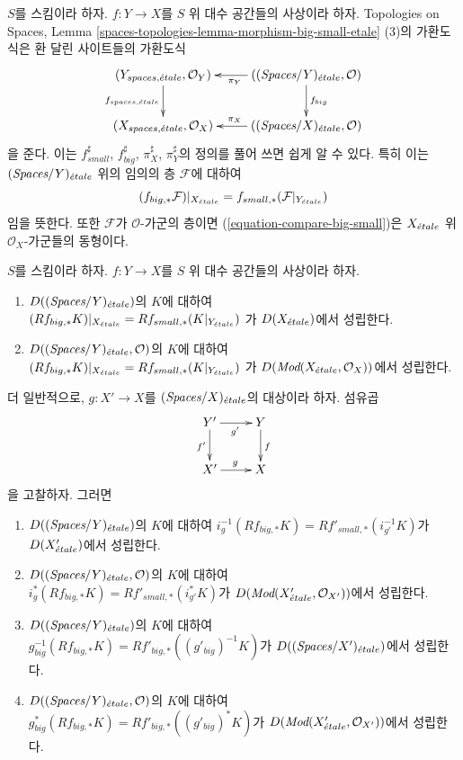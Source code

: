 \noindent
$S$를 스킴이라 하자.
$f : Y \to X$를 $S$ 위 대수 공간들의 사상이라 하자.
Topologies on Spaces, Lemma
\ref{spaces-topologies-lemma-morphism-big-small-etale} (3)의 가환도식은
환 달린 사이트들의 가환도식
$$
\xymatrix{
(Y_{spaces, \etale}, \mathcal{O}_Y) \ar[d]_{f_{spaces, \etale}} &
((\textit{Spaces}/Y)_\etale, \mathcal{O}) \ar[d]^{f_{big}} \ar[l]^{\pi_Y} \\
(X_{spaces, \etale}, \mathcal{O}_X) &
((\textit{Spaces}/X)_\etale, \mathcal{O}) \ar[l]_{\pi_X}
}
$$
을 준다. 이는 $f_{small}^\sharp$, $f_{big}^\sharp$,
$\pi_X^\sharp$, $\pi_Y^\sharp$의 정의를 풀어 쓰면 쉽게 알 수 있다.
특히 이는 $(\textit{Spaces}/Y)_{\acute{e}tale}$ 위의 임의의 층
$\mathcal{F}$에 대하여
\begin{equation}
\label{equation-compare-big-small}
(f_{big, *}\mathcal{F})|_{X_{\acute{e}tale}} =
f_{small, *}(\mathcal{F}|_{Y_{\acute{e}tale}})
\end{equation}
임을 뜻한다. 또한 $\mathcal{F}$가 $\mathcal{O}$-가군의 층이면
(\ref{equation-compare-big-small})은 $X_{\acute{e}tale}$ 위
$\mathcal{O}_X$-가군들의 동형이다.

\begin{lemma}
\label{lemma-compare-higher-direct-image}
$S$를 스킴이라 하자.
$f : Y \to X$를 $S$ 위 대수 공간들의 사상이라 하자.
\begin{enumerate}
\item $D((\textit{Spaces}/Y)_{\acute{e}tale})$의 $K$에 대하여\\
$
(Rf_{big, *}K)|_{X_{\acute{e}tale}} = Rf_{small, *}(K|_{Y_{\acute{e}tale}})
$
가 $D(X_{\acute{e}tale})$에서 성립한다.
\item $D((\textit{Spaces}/Y)_{\acute{e}tale}, \mathcal{O})$의 $K$에 대하여\\
$
(Rf_{big, *}K)|_{X_{\acute{e}tale}} = Rf_{small, *}(K|_{Y_{\acute{e}tale}})
$
가 $D(\textit{Mod}(X_{\acute{e}tale}, \mathcal{O}_X))$에서 성립한다.
\end{enumerate}
더 일반적으로, $g : X' \to X$를
$(\textit{Spaces}/X)_{\acute{e}tale}$의 대상이라 하자. 섬유곱
$$
\xymatrix{
Y' \ar[r]_{g'} \ar[d]_{f'} & Y \ar[d]^f \\
X' \ar[r]^g & X
}
$$
을 고찰하자. 그러면
\begin{enumerate}
\item[(3)] $D((\textit{Spaces}/Y)_{\acute{e}tale})$의 $K$에 대하여
$i_g^{-1}(Rf_{big, *}K) = Rf'_{small, *}(i_{g'}^{-1}K)$가
$D(X'_{\acute{e}tale})$에서 성립한다.
\item[(4)] $D((\textit{Spaces}/Y)_{\acute{e}tale}, \mathcal{O})$의 $K$에 대하여\\
$i_g^*(Rf_{big, *}K) = Rf'_{small, *}(i_{g'}^*K)$가
$D(\textit{Mod}(X'_{\acute{e}tale}, \mathcal{O}_{X'}))$에서 성립한다.
\item[(5)] $D((\textit{Spaces}/Y)_{\acute{e}tale})$의 $K$에 대하여\\
$g_{big}^{-1}(Rf_{big, *}K) = Rf'_{big, *}((g'_{big})^{-1}K)$가
$D((\textit{Spaces}/X')_{\acute{e}tale})$에서 성립한다.
\item[(6)] $D((\textit{Spaces}/Y)_{\acute{e}tale}, \mathcal{O})$의 $K$에 대하여\\
$g_{big}^*(Rf_{big, *}K) = Rf'_{big, *}((g'_{big})^*K)$가
$D(\textit{Mod}(X'_{\acute{e}tale}, \mathcal{O}_{X'}))$에서 성립한다.
\end{enumerate}
\end{lemma}

